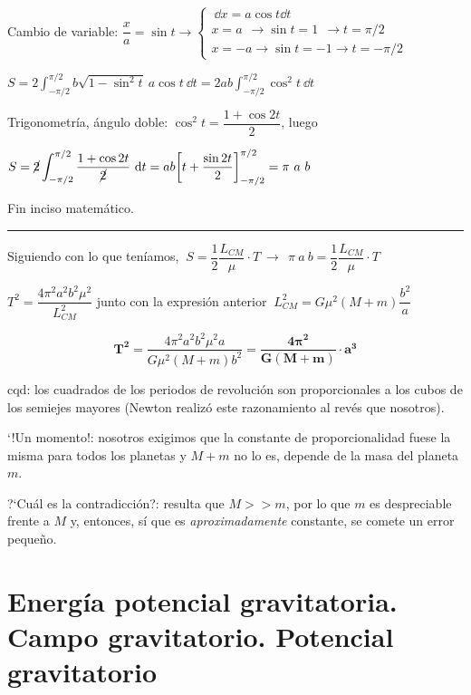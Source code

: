 Cambio de variable: $\dfrac x a =\sin t \to \begin{cases}
\ \dd x= a \cos t \dd t \\
x=a \ \ \to \sin t = 1\ \  \to t=\pi/2 \\
x=-a \to \sin t = -1 \to t=-\pi/2  	
 \end{cases}$

$\displaystyle S = 2 \int_{-\pi/2}^{\pi/2} b \sqrt{1-\sin^2 t}\ a \cos t\ \dd t=2ab\int_{-\pi/2}^{\pi/2} \cos^2 t\ \dd t$

Trigonometría, ángulo doble: $	\cos^2 t =\dfrac{1+\cos 2t}{2}$, luego

$\displaystyle S=\cancel{2} \int_{-\pi/2}^{\pi/2} \dfrac{1+\cos 2t}{\cancel{2}}\ \dd t = ab {\left[ t+\dfrac {\sin 2t}{2} \right]}_{-\pi/2}^{\pi/2} =\pi \ a \ b$

\textcolor{gris}{ Fin inciso matemático. \hspace{5mm} \rule{67mm}{0.4pt} }
\vspace{3mm} %

Siguiendo con lo que teníamos, $\ \displaystyle  S= \dfrac 1 2 \dfrac{L_{CM}}{\mu}\cdot T \  \to \ \ \pi \ a \ b = \dfrac 1 2 \dfrac{L_{CM}}{\mu}\cdot T$

$T^2 = \dfrac{4 \pi^2 a^2 b^2 \mu^2}{L^2_{CM}} $ junto con la expresión anterior $\ L^2_{CM}=G\mu^2 (M+m) \dfrac {b^2}{a}$

\begin{equation}
\boldsymbol{ T^2 } = \dfrac{4 \pi^2 a^2 b^2 \mu^2 a}{G \mu^2 (M+m) b^2} =  \boldsymbol{ \dfrac {4\pi^2}{G(M+m)} \cdot a^3 }
\end{equation}

cqd: los cuadrados de los periodos de revolución son proporcionales a los cubos de los semiejes mayores (Newton realizó este razonamiento al revés que nosotros).

`!Un momento!: nosotros exigimos que la constante de proporcionalidad fuese la misma para todos los planetas y $M+m$ no lo es, depende de la masa del planeta $m$.

?`Cuál es la contradicción?: resulta que $M>>m$, por lo que $m$ es despreciable frente a $M$ y, entonces, sí que es \emph{aproximadamente} constante, se comete un error pequeño.

\section[Energía potencial gravitatoria. Campo gravitatorio. Potencial gravitatorio]{Energía potencial gravitatoria. Campo gravitatorio. Potencial gravitatorio}

